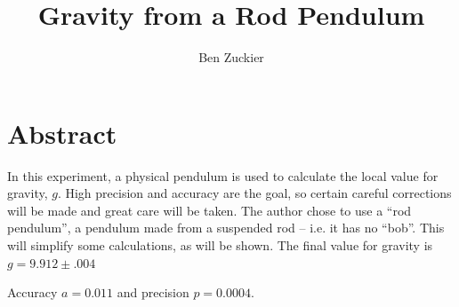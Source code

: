 \documentclass[12pt]{article}
\author{Ben Zuckier}
\date{\vspace{-3ex}}
\title{\vspace{-2.5cm}Gravity from a Rod Pendulum}
\begin{document}
\maketitle

\vspace{-1cm}

\section{Abstract}
    In this experiment, a physical pendulum is used to calculate the local value for gravity, $g$. High precision and accuracy are the goal, so certain careful corrections will be made and great care will be taken. The author chose to use a ``rod pendulum'', a pendulum made from a suspended rod -- i.e. it has no ``bob''. This will simplify some calculations, as will be shown. The final value for gravity is $g=9.912 \pm .004$

    Accuracy $a=0.011$ and precision $p=0.0004$.
\end{document}
